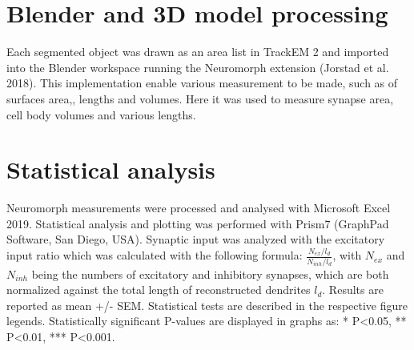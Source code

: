 \section{Blender and 3D model processing}
\label{sec:blender}
Each segmented object was drawn as an area list in TrackEM 2 and imported into the Blender workspace running the Neuromorph extension (Jorstad et al. 2018). This implementation enable various measurement to be made, such as of surfaces area,, lengths and volumes. Here it was used to measure synapse area, cell body volumes and various lengths.  
\section{Statistical analysis}
\label{sec:stat}
Neuromorph measurements were processed and analysed with Microsoft Excel 2019. Statistical analysis and plotting was performed with Prism7 (GraphPad Software, San Diego, USA). Synaptic input was analyzed with the excitatory input ratio which was calculated with the following formula: $\frac{N_{ex} / l_{d}}{N_{inh} / l_{d}}$, with $N_{ex}$ and $N_{inh}$ being the numbers of excitatory and inhibitory synapses, which are both normalized against the total length of reconstructed dendrites $l_{d}$. Results are reported as mean +/- SEM. Statistical tests are described in the respective figure legends.  Statistically  significant P-values are displayed in graphs as: * P<0.05, ** P<0.01, *** P<0.001. 

